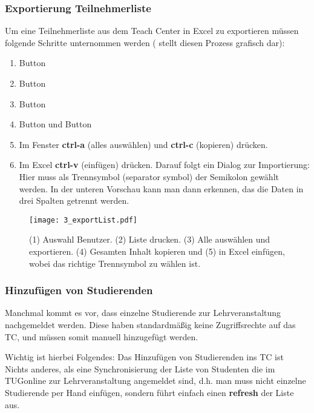 \subsubsection{Exportierung Teilnehmerliste}

Um eine Teilnehmerliste aus dem Teach Center in Excel zu exportieren müssen
folgende Schritte unternommen werden ( stellt diesen
Prozess grafisch dar):

\begin{enumerate}
\item Button 
\item Button 
\item Button 
\item Button  und Button 
\item Im Fenster {\bf ctrl-a} (alles auswählen) und {\bf ctrl-c} (kopieren)
  drücken.
\item Im Excel {\bf ctrl-v} (einfügen) drücken. Darauf folgt ein Dialog zur
  Importierung: Hier muss als Trennsymbol (\glqq{}separator symbol\grqq{})
  der Semikolon gewählt werden. In der unteren Vorschau kann man dann erkennen,
  das die Daten in drei Spalten getrennt werden.
\end{enumerate}

\begin{figure}[htbp]
  \texttt{[image: 3\_exportList.pdf]}
  \caption{ (1) Auswahl Benutzer. (2) Liste drucken. (3) Alle ausw\"{a}hlen und
    exportieren. (4) Gesamten Inhalt kopieren und (5) in Excel einf\"{u}gen,
    wobei das richtige Trennsymbol zu w\"{a}hlen ist.}
  \label{fig:export}
\end{figure}

\subsubsection{Hinzufügen von Studierenden}

Manchmal kommt es vor, dass einzelne Studierende zur Lehrveranstaltung
nachgemeldet werden. Diese haben standardmäßig keine Zugriffsrechte auf das
TC, und müssen somit manuell hinzugefügt werden.

Wichtig ist hierbei Folgendes: Das 
\glqq{}Hinzufügen von Studierenden ins TC\grqq{} ist Nichts anderes, als eine 
Synchronisierung der Liste von Studenten die im TUGonline zur Lehrveranstaltung 
angemeldet sind, d.h. man muss nicht einzelne Studierende per Hand einfügen, 
sondern führt einfach einen {\bf refresh} der Liste aus.

